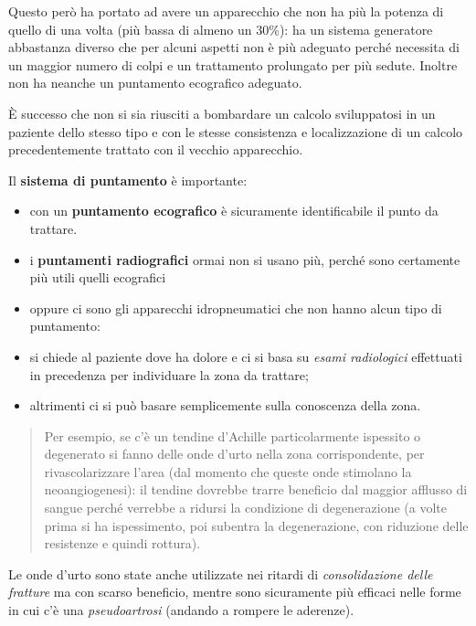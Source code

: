 \documentclass[]{article}
\begin{document}
Questo però ha portato ad avere un apparecchio che non ha più la potenza
di quello di una volta (più bassa di almeno un 30\%): ha un sistema
generatore abbastanza diverso che per alcuni aspetti non è più adeguato
perché necessita di un maggior numero di colpi e un trattamento
prolungato per più sedute. Inoltre non ha neanche un puntamento
ecografico adeguato.

È successo che non si sia riusciti a bombardare un calcolo sviluppatosi
in un paziente dello stesso tipo e con le stesse consistenza e
localizzazione di un calcolo precedentemente trattato con il vecchio
apparecchio.

Il \textbf{sistema di puntamento} è importante:

\begin{itemize}
\item
  con un \textbf{puntamento ecografico} è sicuramente identificabile il
  punto da trattare.
\item
  i \textbf{puntamenti radiografici} ormai non si usano più, perché sono
  certamente più utili quelli ecografici
\item
  oppure ci sono gli apparecchi idropneumatici che non hanno alcun tipo
  di puntamento:
\end{itemize}

\begin{itemize}
\item
  si chiede al paziente dove ha dolore e ci si basa su \emph{esami
  radiologici} effettuati in precedenza per individuare la zona da
  trattare;
\item
  altrimenti ci si può basare semplicemente sulla conoscenza della zona.
\end{itemize}

\begin{quote}
Per esempio, se c'è un tendine d'Achille particolarmente ispessito o
degenerato si fanno delle onde d'urto nella zona corrispondente, per
rivascolarizzare l'area (dal momento che queste onde stimolano la
neoangiogenesi): il tendine dovrebbe trarre beneficio dal maggior
afflusso di sangue perché verrebbe a ridursi la condizione di
degenerazione (a volte prima si ha ispessimento, poi subentra la
degenerazione, con riduzione delle resistenze e quindi rottura).
\end{quote}

Le onde d'urto sono state anche utilizzate nei ritardi di
\emph{consolidazione delle fratture} ma con scarso beneficio, mentre
sono sicuramente più efficaci nelle forme in cui c'è una
\emph{pseudoartrosi} (andando a rompere le aderenze).
\end{document}
